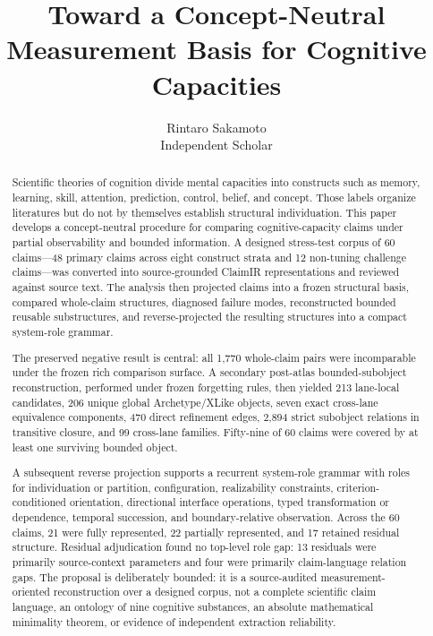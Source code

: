 \documentclass[11pt]{article}
\title{Toward a Concept-Neutral Measurement Basis for Cognitive Capacities}
\author{Rintaro Sakamoto\\Independent Scholar}
\date{}
\begin{document}
\maketitle

\begin{abstract}
Scientific theories of cognition divide mental capacities into constructs such as memory, learning, skill, attention, prediction, control, belief, and concept. Those labels organize literatures but do not by themselves establish structural individuation. This paper develops a concept-neutral procedure for comparing cognitive-capacity claims under partial observability and bounded information. A designed stress-test corpus of 60 claims---48 primary claims across eight construct strata and 12 non-tuning challenge claims---was converted into source-grounded ClaimIR representations and reviewed against source text. The analysis then projected claims into a frozen structural basis, compared whole-claim structures, diagnosed failure modes, reconstructed bounded reusable substructures, and reverse-projected the resulting structures into a compact system-role grammar.

The preserved negative result is central: all 1,770 whole-claim pairs were incomparable under the frozen rich comparison surface. A secondary post-atlas bounded-subobject reconstruction, performed under frozen forgetting rules, then yielded 213 lane-local candidates, 206 unique global Archetype/XLike objects, seven exact cross-lane equivalence components, 470 direct refinement edges, 2,894 strict subobject relations in transitive closure, and 99 cross-lane families. Fifty-nine of 60 claims were covered by at least one surviving bounded object.

A subsequent reverse projection supports a recurrent system-role grammar with roles for individuation or partition, configuration, realizability constraints, criterion-conditioned orientation, directional interface operations, typed transformation or dependence, temporal succession, and boundary-relative observation. Across the 60 claims, 21 were fully represented, 22 partially represented, and 17 retained residual structure. Residual adjudication found no top-level role gap: 13 residuals were primarily source-context parameters and four were primarily claim-language relation gaps. The proposal is deliberately bounded: it is a source-audited measurement-oriented reconstruction over a designed corpus, not a complete scientific claim language, an ontology of nine cognitive substances, an absolute mathematical minimality theorem, or evidence of independent extraction reliability.
\end{abstract}
\end{document}
